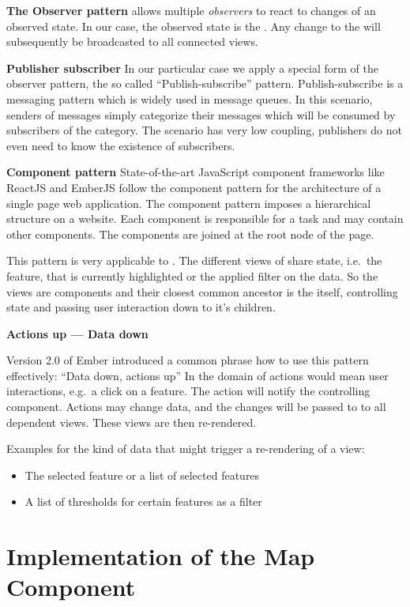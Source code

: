 \textbf{The Observer pattern} allows multiple \emph{observers} to react to changes of an observed state.
In our case, the observed state is the .
Any change to the  will subsequently be broadcasted to all connected views.


\textbf{Publisher subscriber}
In our particular case we apply a special form of the observer pattern, the so called ``Publish-subscribe'' pattern\cite{Eugster2003}.
Publish-subscribe is a messaging pattern which is widely used in message queues.
In this scenario, senders of messages simply categorize their messages which will be consumed by subscribers of the category.
The scenario has very low coupling, publishers do not even need to know the existence of subscribers.

\textbf{Component pattern}
State-of-the-art JavaScript component frameworks like ReactJS and EmberJS follow the component pattern for the architecture of a single page web application.
The component pattern imposes a hierarchical structure on a website.
Each component is responsible for a task and may contain other components.
The components are joined at the root node of the page.

This pattern is very applicable to \cmvs{}.
The different views of \cmvs{} share state, i.e.\ the feature, that is currently highlighted or the applied filter on the data.
So the views are components and their closest common ancestor is the \cmv{} itself, controlling state and passing user interaction down to it's children.

\textbf{Actions up --- Data down}

Version 2.0 of Ember introduced a common phrase how to use this pattern effectively: ``Data down, actions up''\cite{Emberigniter2017}
In the domain of \cmvs{} actions would mean user interactions, e.g.\ a click on a feature.
The action will notify the controlling \cmv{} component.
Actions may change data, and the changes will be passed to to all dependent views.
These views are then re-rendered.

Examples for the kind of data that might trigger a re-rendering of a view:
\begin{itemize}
  \item
    The selected feature or a list of selected features
  \item
    A list of thresholds for certain features as a filter
\end{itemize}


\section{Implementation of the Map Component}

